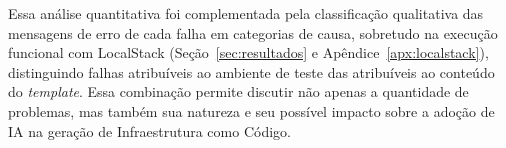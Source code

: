 Essa análise quantitativa foi complementada pela classificação qualitativa das mensagens de erro de cada falha em categorias de causa, sobretudo na execução funcional com LocalStack (Seção~\ref{sec:resultados} e Apêndice~\ref{apx:localstack}), distinguindo falhas atribuíveis ao ambiente de teste das atribuíveis ao conteúdo do \textit{template}. Essa combinação permite discutir não apenas a quantidade de problemas, mas também sua natureza e seu possível impacto sobre a adoção de IA na geração de Infraestrutura como Código.
